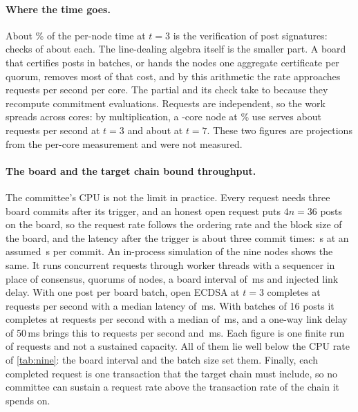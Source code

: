\paragraph{Where the time goes.} About \ninePostSharePct{}\% of the per-node time at $t = 3$ is the verification of post signatures: \ninePostChecksLow{} checks of about \ninePostCheckMicros{}\us{} each. The line-dealing algebra itself is the smaller part. A board that certifies posts in batches, or hands the nodes one aggregate certificate per quorum, removes most of that cost, and by this arithmetic the rate approaches \nineBatchedRate{} requests per second per core. The partial and its check take \ninePartialMinMicros{} to \ninePartialMaxMicros{}\us{} because they recompute commitment evaluations. Requests are independent, so the work spreads across cores: by multiplication, a \nineNodeCores{}-core node at \nineNodeUsePct{}\% use serves about \nineNodeRateLow{} requests per second at $t = 3$ and about \nineNodeRateHigh{} at $t = 7$. These two figures are projections from the per-core measurement and were not measured.

\paragraph{The board and the target chain bound throughput.} The committee's CPU is not the limit in practice. Every request needs three board commits after its trigger, and an honest open request puts $4n = 36$ posts on the board, so the request rate follows the ordering rate and the block size of the board, and the latency after the trigger is about three commit times: \latencySeconds{}\,s at an assumed \commitSeconds{}\,s per commit. An in-process simulation of the nine nodes shows the same. It runs \simRequests{} concurrent requests through worker threads with a sequencer in place of consensus, quorums of \simQuorum{} nodes, a board interval of \simBoardIntervalMs{}\,ms and injected link delay. With one post per board batch, open ECDSA at $t = 3$ completes at \simLinkLowZeroOneRate{} requests per second with a median latency of \simLinkLowZeroOnePFifty{}\,ms. With batches of 16 posts it completes at \simLinkLowZeroSixteenRate{} requests per second with a median of \simLinkLowZeroSixteenPFifty{}\,ms, and a one-way link delay of 50\,ms brings this to \simLinkLowFiftySixteenRate{} requests per second and \simLinkLowFiftySixteenPFifty{}\,ms. Each figure is one finite run of \simRequests{} requests and not a sustained capacity. All of them lie well below the CPU rate of \cref{tab:nine}: the board interval and the batch size set them. Finally, each completed request is one transaction that the target chain must include, so no committee can sustain a request rate above the transaction rate of the chain it spends on.

